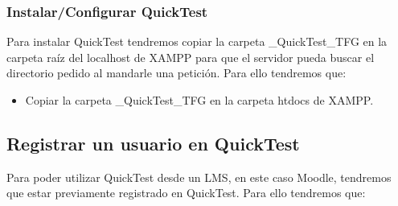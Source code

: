 \subsubsection{Instalar/Configurar QuickTest}

Para instalar QuickTest tendremos copiar la carpeta \_QuickTest\_TFG en la carpeta raíz del localhost de XAMPP para que el servidor pueda buscar el directorio pedido al mandarle una petición.
Para ello tendremos que:

\begin{itemize}

	\item Copiar la carpeta \_QuickTest\_TFG en la carpeta htdocs de XAMPP. 

\end{itemize}

\subsection{Registrar un usuario en QuickTest}

Para poder utilizar QuickTest desde un LMS, en este caso Moodle, tendremos que estar previamente registrado en QuickTest. Para ello tendremos que:

